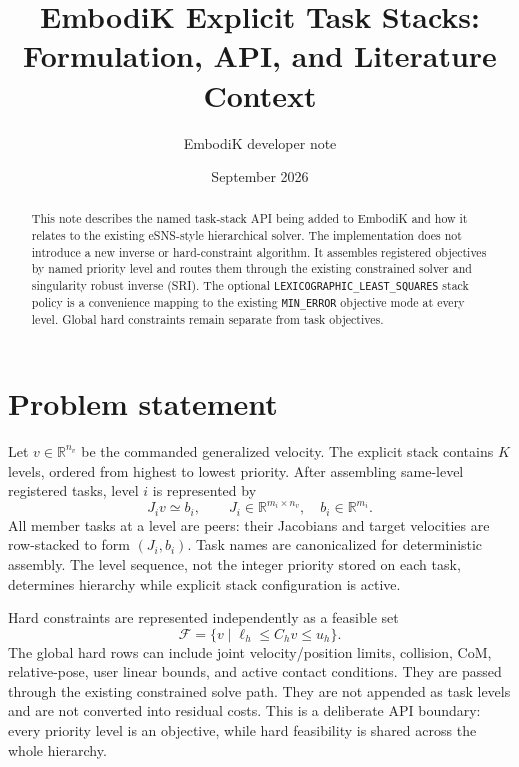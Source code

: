 \documentclass[11pt]{article}
\title{EmbodiK Explicit Task Stacks: Formulation, API, and Literature Context}
\author{EmbodiK developer note}
\date{September 2026}
\begin{document}
\maketitle

\begin{abstract}
This note describes the named task-stack API being added to EmbodiK and how it
relates to the existing eSNS-style hierarchical solver. The implementation
does not introduce a new inverse or hard-constraint algorithm. It assembles
registered objectives by named priority level and routes them through the
existing constrained solver and singularity robust inverse (SRI). The optional
\texttt{LEXICOGRAPHIC\_LEAST\_SQUARES} stack policy is a convenience mapping to
the existing \texttt{MIN\_ERROR} objective mode at every level. Global hard
constraints remain separate from task objectives.
\end{abstract}

\section{Problem statement}

Let $v\in\mathbb{R}^{n_v}$ be the commanded generalized velocity. The explicit
stack contains $K$ levels, ordered from highest to lowest priority. After
assembling same-level registered tasks, level $i$ is represented by
\begin{equation}
  J_i v \simeq b_i,
  \qquad J_i\in\mathbb{R}^{m_i\times n_v},\quad
  b_i\in\mathbb{R}^{m_i}.
  \label{eq:level}
\end{equation}
All member tasks at a level are peers: their Jacobians and target velocities
are row-stacked to form $(J_i,b_i)$. Task names are canonicalized for
deterministic assembly. The level sequence, not the integer priority stored on
each task, determines hierarchy while explicit stack configuration is active.

Hard constraints are represented independently as a feasible set
\begin{equation}
  \mathcal{F}=\{v\mid \ell_h\le C_hv\le u_h\}.
  \label{eq:hard}
\end{equation}
The global hard rows can include joint velocity/position limits, collision,
CoM, relative-pose, user linear bounds, and active contact conditions. They
are passed through the existing constrained solve path. They are not appended
as task levels and are not converted into residual costs. This is a deliberate
API boundary: every priority level is an objective, while hard feasibility is
shared across the whole hierarchy.
\end{document}
